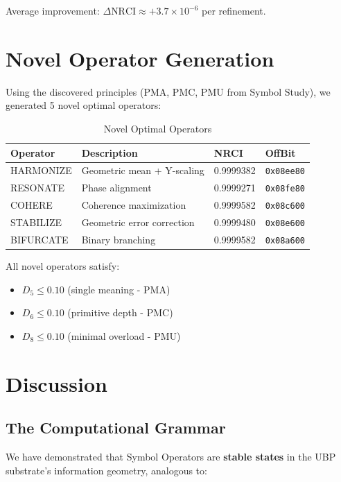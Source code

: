 \documentclass[12pt,a4paper]{article}
\begin{document}
Average improvement: $\Delta \text{NRCI} \approx +3.7 \times 10^{-6}$ per refinement.

\section{Novel Operator Generation}

Using the discovered principles (PMA, PMC, PMU from Symbol Study), we generated 5 novel optimal operators:

\begin{table}[h]
\centering
\small
\begin{tabular}{llll}
\toprule
\textbf{Operator} & \textbf{Description} & \textbf{NRCI} & \textbf{OffBit} \\
\midrule
HARMONIZE & Geometric mean + Y-scaling & 0.9999382 & \texttt{0x08ee80} \\
RESONATE & Phase alignment & 0.9999271 & \texttt{0x08fe80} \\
COHERE & Coherence maximization & 0.9999582 & \texttt{0x08c600} \\
STABILIZE & Geometric error correction & 0.9999480 & \texttt{0x08e600} \\
BIFURCATE & Binary branching & 0.9999582 & \texttt{0x08a600} \\
\bottomrule
\end{tabular}
\caption{Novel Optimal Operators}
\label{tab:novel}
\end{table}

All novel operators satisfy:
\begin{itemize}
    \item $D_5 \leq 0.10$ (single meaning - PMA)
    \item $D_6 \leq 0.10$ (primitive depth - PMC)
    \item $D_8 \leq 0.10$ (minimal overload - PMU)
\end{itemize}

\section{Discussion}

\subsection{The Computational Grammar}

We have demonstrated that Symbol Operators are \textbf{stable states} in the UBP substrate's information geometry, analogous to:
\end{document}
